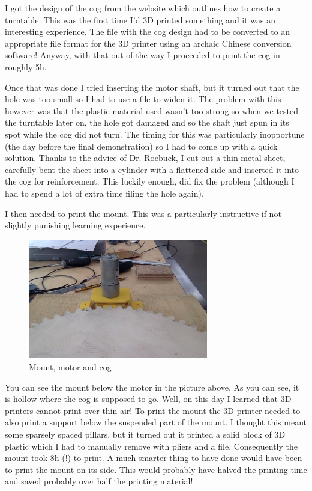 \documentclass[a4paper]{article}
\begin{document}
I got the design of the cog from the website which outlines how to create a turntable.
This was the first time I'd 3D printed something and it was an interesting experience.
The file with the cog design had to be converted to an appropriate file format for the 3D printer using an archaic Chinese conversion software!
Anyway, with that out of the way I proceeded to print the cog in roughly 5h.

Once that was done I tried inserting the motor shaft, but it turned out that the hole was too small so I had to use a file to widen it.
The problem with this however was that the plastic material used wasn't too strong so when we tested the turntable later on, the hole got damaged and so the shaft just spun in its spot while the cog did not turn.
The timing for this was particularly inopportune (the day before the final demonstration) so I had to come up with a quick solution.
Thanks to the advice of Dr. Roebuck, I cut out a thin metal sheet, carefully bent the sheet into a cylinder with a flattened side and inserted it into the cog for reinforcement. 
This luckily enough, did fix the problem (although I had to spend a lot of extra time filing the hole again).

I then needed to print the mount.
This was a particularly instructive if not slightly punishing learning experience.

\begin{figure}[H]
  \centering
    \includegraphics[width=0.7\textwidth]{figures/mounted_motor.jpg}
    \caption{Mount, motor and cog}
  \label{fig:f2}
\end{figure}

You can see the mount below the motor in the picture above.
As you can see, it is hollow where the cog is supposed to go.
Well, on this day I learned that 3D printers cannot print over thin air!
To print the mount the 3D printer needed to also print a support below the suspended part of the mount. 
I thought this meant some sparsely spaced pillars, but it turned out it printed a solid block of 3D plastic which I had to manually remove with pliers and a file.
Consequently the mount took 8h (!) to print.
A much smarter thing to have done would have been to print the mount on its side.
This would probably have halved the printing time and saved probably over half the printing material!
\end{document}
